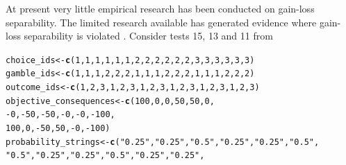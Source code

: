 \documentclass{article}\usepackage[]{graphicx}\usepackage[]{color}
\makeatletter
\newcommand{\hlnum}[1]{\textcolor[rgb]{0.686,0.059,0.569}{#1}}%
\newcommand{\hlstr}[1]{\textcolor[rgb]{0.192,0.494,0.8}{#1}}%
\newcommand{\hlopt}[1]{\textcolor[rgb]{0,0,0}{#1}}%
\newcommand{\hlstd}[1]{\textcolor[rgb]{0.345,0.345,0.345}{#1}}%
\newcommand{\hlkwb}[1]{\textcolor[rgb]{0.69,0.353,0.396}{#1}}%
\newcommand{\hlkwd}[1]{\textcolor[rgb]{0.737,0.353,0.396}{\textbf{#1}}}%
\newenvironment{kframe}{%
 \def\at@end@of@kframe{}%
 \ifinner\ifhmode%
  \def\at@end@of@kframe{\end{minipage}}%
  \begin{minipage}{\columnwidth}%
 \fi\fi%
 \def\FrameCommand##1{\hskip\@totalleftmargin \hskip-\fboxsep
 \colorbox{shadecolor}{##1}\hskip-\fboxsep
     \hskip-\linewidth \hskip-\@totalleftmargin \hskip\columnwidth}%
 \MakeFramed {\advance\hsize-\width
   \@totalleftmargin\z@ \linewidth\hsize
   \@setminipage}}%
 {\par\unskip\endMakeFramed%
 \at@end@of@kframe}
\newenvironment{knitrout}{}{} %
\makeatother
\begin{document}
At present very little empirical research has been conducted on gain-loss separability. The limited research available has generated evidence where gain-loss separability is violated \citep*{Birnbaum_Bahra_2007, Wu_Markle_2008, Por_Budescu_2013}. Consider tests 15, 13 and 11 from \citet[][Table 4 p. 1021]{Birnbaum_Bahra_2007}

\begin{knitrout}
\color{fgcolor}\begin{kframe}
\begin{alltt}
\hlstd{choice_ids} \hlkwb{<-} \hlkwd{c}\hlstd{(}\hlnum{1}\hlstd{,} \hlnum{1}\hlstd{,} \hlnum{1}\hlstd{,} \hlnum{1}\hlstd{,} \hlnum{1}\hlstd{,} \hlnum{1}\hlstd{,} \hlnum{2}\hlstd{,} \hlnum{2}\hlstd{,} \hlnum{2}\hlstd{,} \hlnum{2}\hlstd{,} \hlnum{2}\hlstd{,} \hlnum{2}\hlstd{,} \hlnum{3}\hlstd{,} \hlnum{3}\hlstd{,} \hlnum{3}\hlstd{,} \hlnum{3}\hlstd{,} \hlnum{3}\hlstd{,} \hlnum{3}\hlstd{)}
\hlstd{gamble_ids} \hlkwb{<-} \hlkwd{c}\hlstd{(}\hlnum{1}\hlstd{,} \hlnum{1}\hlstd{,} \hlnum{1}\hlstd{,} \hlnum{2}\hlstd{,} \hlnum{2}\hlstd{,} \hlnum{2}\hlstd{,} \hlnum{1}\hlstd{,} \hlnum{1}\hlstd{,} \hlnum{1}\hlstd{,} \hlnum{2}\hlstd{,} \hlnum{2}\hlstd{,} \hlnum{2}\hlstd{,} \hlnum{1}\hlstd{,} \hlnum{1}\hlstd{,} \hlnum{1}\hlstd{,} \hlnum{2}\hlstd{,} \hlnum{2}\hlstd{,} \hlnum{2}\hlstd{)}
\hlstd{outcome_ids} \hlkwb{<-} \hlkwd{c}\hlstd{(}\hlnum{1}\hlstd{,} \hlnum{2}\hlstd{,} \hlnum{3}\hlstd{,} \hlnum{1}\hlstd{,} \hlnum{2}\hlstd{,} \hlnum{3}\hlstd{,} \hlnum{1}\hlstd{,} \hlnum{2}\hlstd{,} \hlnum{3}\hlstd{,} \hlnum{1}\hlstd{,} \hlnum{2}\hlstd{,} \hlnum{3}\hlstd{,} \hlnum{1}\hlstd{,} \hlnum{2}\hlstd{,} \hlnum{3}\hlstd{,} \hlnum{1}\hlstd{,} \hlnum{2}\hlstd{,} \hlnum{3}\hlstd{)}
\hlstd{objective_consequences} \hlkwb{<-} \hlkwd{c}\hlstd{(}\hlnum{100}\hlstd{,} \hlnum{0}\hlstd{,} \hlnum{0}\hlstd{,} \hlnum{50}\hlstd{,} \hlnum{50}\hlstd{,} \hlnum{0}\hlstd{,}
        \hlopt{-}\hlnum{0}\hlstd{,} \hlopt{-}\hlnum{50}\hlstd{,} \hlopt{-}\hlnum{50}\hlstd{,} \hlopt{-}\hlnum{0}\hlstd{,} \hlopt{-}\hlnum{0}\hlstd{,} \hlopt{-}\hlnum{100}\hlstd{,}
        \hlnum{100}\hlstd{,} \hlnum{0}\hlstd{,} \hlopt{-}\hlnum{50}\hlstd{,} \hlnum{50}\hlstd{,} \hlopt{-}\hlnum{0}\hlstd{,} \hlopt{-}\hlnum{100}\hlstd{)}
\hlstd{probability_strings} \hlkwb{<-} \hlkwd{c}\hlstd{(}\hlstr{"0.25"}\hlstd{,} \hlstr{"0.25"}\hlstd{,} \hlstr{"0.5"}\hlstd{,} \hlstr{"0.25"}\hlstd{,} \hlstr{"0.25"}\hlstd{,} \hlstr{"0.5"}\hlstd{,}
        \hlstr{"0.5"}\hlstd{,} \hlstr{"0.25"}\hlstd{,} \hlstr{"0.25"}\hlstd{,} \hlstr{"0.5"}\hlstd{,} \hlstr{"0.25"}\hlstd{,} \hlstr{"0.25"}\hlstd{,}

\end{alltt}
\end{kframe}
\end{knitrout}
\end{document}
